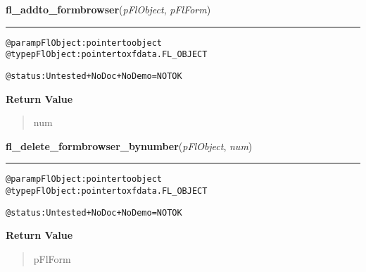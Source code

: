     \vspace{0.5ex}

\hspace{.8\funcindent}\begin{boxedminipage}{\funcwidth}

    \raggedright \textbf{fl\_addto\_formbrowser}(\textit{pFlObject}, \textit{pFlForm})

    \vspace{-1.5ex}

    \rule{\textwidth}{0.5\fboxrule}
\setlength{\parskip}{2ex}
\begin{alltt}
@param pFlObject: pointer to object
@type pFlObject: pointer to xfdata.FL\_OBJECT

        @status: Untested + NoDoc + NoDemo = NOT OK
    
\end{alltt}

\setlength{\parskip}{1ex}
      \textbf{Return Value}
    \vspace{-1ex}

      \begin{quote}
      num

      \end{quote}

    \end{boxedminipage}

    \label{xformslib:flformbrowser:fl_delete_formbrowser_bynumber}

    \vspace{0.5ex}

\hspace{.8\funcindent}\begin{boxedminipage}{\funcwidth}

    \raggedright \textbf{fl\_delete\_formbrowser\_bynumber}(\textit{pFlObject}, \textit{num})

    \vspace{-1.5ex}

    \rule{\textwidth}{0.5\fboxrule}
\setlength{\parskip}{2ex}
\begin{alltt}
        @param pFlObject: pointer to object
@type pFlObject: pointer to xfdata.FL\_OBJECT

        @status: Untested + NoDoc + NoDemo = NOT OK
    
\end{alltt}

\setlength{\parskip}{1ex}
      \textbf{Return Value}
    \vspace{-1ex}

      \begin{quote}
      pFlForm

      \end{quote}

    \end{boxedminipage}

